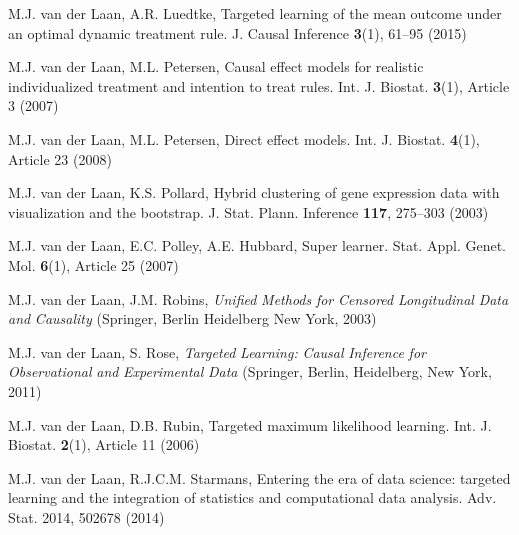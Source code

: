\begin{list}{}{\setlength{\leftmargin}{2.1em}\setlength{\labelwidth}{0pt}
  \setlength{\labelsep}{0pt}\setlength{\itemindent}{-2.1em}
  \setlength{\parsep}{0pt}\setlength{\itemsep}{2pt}\setlength{\topsep}{0pt}}
\item\label{refentry:REF425}M.J. van der Laan, A.R. Luedtke, Targeted learning of the mean outcome under an optimal dynamic treatment rule. J. Causal Inference \textbf{3}(1), 61--95 (2015)\label{refend:REF425}
\item\label{refentry:REF426}M.J. van der Laan, M.L. Petersen, Causal effect models for realistic individualized treatment and intention to treat rules. Int. J. Biostat. \textbf{3}(1), Article 3 (2007)\label{refend:REF426}
\item\label{refentry:REF427}M.J. van der Laan, M.L. Petersen, Direct effect models. Int. J. Biostat. \textbf{4}(1), Article 23 (2008)\label{refend:REF427}
\item\label{refentry:REF428}M.J. van der Laan, K.S. Pollard, Hybrid clustering of gene expression data with visualization and the bootstrap. J. Stat. Plann. Inference \textbf{117}, 275--303 (2003)\label{refend:REF428}
\item\label{refentry:REF429}M.J. van der Laan, E.C. Polley, A.E. Hubbard, Super learner. Stat. Appl. Genet. Mol. \textbf{6}(1), Article 25 (2007)\label{refend:REF429}
\item\label{refentry:REF430}M.J. van der Laan, J.M. Robins, \textit{Unified} \textit{Methods} \textit{for} \textit{Censored} \textit{Longitudinal} \textit{Data} \textit{and} \textit{Causality} (Springer, Berlin Heidelberg New York, 2003)\label{refend:REF430}
\item\label{refentry:REF431}M.J. van der Laan, S. Rose, \textit{Targeted} \textit{Learning:} \textit{Causal} \textit{Inference} \textit{for} \textit{Observational} \textit{and} \textit{Experimental} \textit{Data} (Springer, Berlin, Heidelberg, New York, 2011)\label{refend:REF431}
\item\label{refentry:REF432}M.J. van der Laan, D.B. Rubin, Targeted maximum likelihood learning. Int. J. Biostat. \textbf{2}(1), Article 11 (2006)\label{refend:REF432}
\item\label{refentry:REF433}M.J. van der Laan, R.J.C.M. Starmans, Entering the era of data science: targeted learning and the integration of statistics and computational data analysis. Adv. Stat. 2014, 502678 (2014)\label{refend:REF433}

\end{list}
